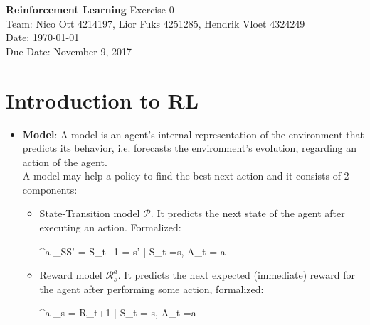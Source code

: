 \documentclass[a4paper, 11pt]{article}
\begin{document}
\noindent
\large\textbf{Reinforcement Learning} \hfill %
\normalsize Exercise 0 \hfill 
\\Team: Nico Ott 4214197, Lior Fuks 4251285, Hendrik Vloet 4324249 \\
\hfill Date: \today \\
\hfill Due Date: November 9, 2017
\section{Introduction to RL}
\begin{itemize}
	\item \textbf{Model}: A model is an agent's internal representation of the environment that predicts its behavior, i.e. forecasts the environment's evolution, regarding an action of the agent.\\
	 A model may help a policy to find the best next action and it consists of 2 components:
	\begin{itemize}
		\item State-Transition model $\mathcal{P}$. It predicts the next state of the agent after executing an action. Formalized:
		\begin{flalign*}
			^a _{SS'} =   \left\lbrace S_{t+1}   = s' | S_t =s, A_t = a    \right\rbrace \\
		\end{flalign*}
		\item Reward model $\mathcal{R}^a _s$. It predicts the next expected (immediate) reward for the agent after performing some action, formalized:
		\begin{flalign*}
			^a _s =  \lbrace R_{t+1} | S_t = s, A_t =a \rbrace \\
		\end{flalign*}
	\end{itemize}

\end{itemize}
\end{document}
